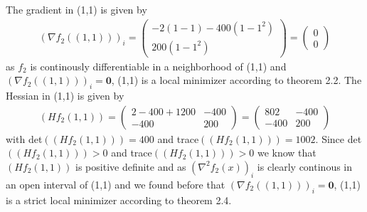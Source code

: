 \documentclass[a4paper]{article}
\newcommand{\bt}{\textbf}
\begin{document}
The gradient in (1,1) is given by
\begin{align*}
  (\nabla f_2((1,1)))_i =
  \begin{pmatrix}
    -2(1-1)-400(1-1^2)\\
    200(1-1^2)
  \end{pmatrix} =
  \begin{pmatrix}
    0\\
    0
  \end{pmatrix}
\end{align*}
as $f_2$ is continously differentiable in a neighborhood of (1,1) and $(\nabla f_2((1,1)))_i = \bt{0}$, (1,1) is a local minimizer according to theorem 2.2. The Hessian in (1,1) is given by
\begin{align*}
  (Hf_2(1,1)) =
  \left(
  \begin{array}{cc}
    2-400+1200 & -400\\
    -400       &  200
  \end{array}
  \right)=
  \left(
  \begin{array}{cc}
    802  & -400\\
    -400 &  200
  \end{array}
  \right)
\end{align*}
with det$((Hf_2(1,1)))=400$ and trace$((Hf_2(1,1)))=1002$. Since det$((Hf_2(1,1)))>0$ and trace$((Hf_2(1,1)))>0$ we know that $(Hf_2(1,1))$ is positive definite and as $(\nabla^2 f_2(x))_i$ is clearly continous in an open interval of (1,1) and we found before that $(\nabla f_2((1,1)))_i = \bt{0}$, (1,1) is a strict local minimizer according to theorem 2.4.
\end{document}
